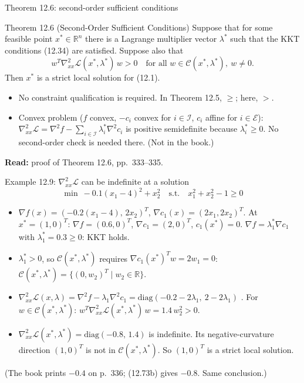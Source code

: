 \documentclass[aspectratio=169,12pt]{beamer}
\newcommand{\R}{\mathbb{R}}
\newcommand{\xs}{x^{*}}
\newcommand{\gradf}{\nabla f}
\newcommand{\hessf}{\nabla^{2} f}
\newcommand{\eqn}[1]{\text{\small(#1)}}
\newcommand{\readbook}[1]{{\color{red}\textbf{Read:} #1}}
\newcommand{\ls}{\lambda^{*}}
\newcommand{\cC}{\mathcal{C}}
\newcommand{\cE}{\mathcal{E}}
\newcommand{\cI}{\mathcal{I}}
\newcommand{\cL}{\mathcal{L}}
\newcommand{\hessL}{\nabla_{xx}^{2}\cL}
\begin{document}
\begin{frame}{Theorem 12.6: second-order sufficient conditions}
  \begin{block}{Theorem 12.6 (Second-Order Sufficient Conditions)}
    Suppose that for some feasible point $\xs\in\R^{n}$ there is a Lagrange multiplier vector $\ls$
    such that the KKT conditions (12.34) are satisfied. Suppose also that
    \[ w^{T}\hessL(\xs,\ls)\,w>0\quad\text{for all } w\in\cC(\xs,\ls),\ w\ne 0 . \tag{12.65} \]
    Then $\xs$ is a strict local solution for (12.1).
  \end{block}
  \begin{itemize}\setlength\itemsep{0.35em}
    \item No constraint qualification is required. In Theorem 12.5, $\ge$; here, $>$.
    \item Convex problem ($f$ convex, $-c_{i}$ convex for $i\in\cI$, $c_{i}$ affine for $i\in\cE$):
      $\hessL=\hessf-\sum_{i\in\cI}\ls_{i}\nabla^{2}c_{i}$ is positive semidefinite because $\ls_{i}\ge 0$.
      No second-order check is needed there. (Not in the book.)
  \end{itemize}
  \readbook{proof of Theorem 12.6, pp.~333--335.}
\end{frame}

\begin{frame}{Example 12.9: $\hessL$ can be indefinite at a solution}
  \[ \min\ -0.1(x_{1}-4)^{2}+x_{2}^{2}\quad\text{s.t.}\quad x_{1}^{2}+x_{2}^{2}-1\ge 0 \tag{12.72} \]
  \begin{itemize}\setlength\itemsep{0.3em}
    \item $\gradf(x)=(-0.2(x_{1}-4),\,2x_{2})^{T}$, $\nabla c_{1}(x)=(2x_{1},2x_{2})^{T}$.
      At $\xs=(1,0)^{T}$: $\gradf=(0.6,0)^{T}$, $\nabla c_{1}=(2,0)^{T}$, $c_{1}(\xs)=0$.
      $\gradf=\ls_{1}\nabla c_{1}$ with $\ls_{1}=0.3\ge 0$: KKT holds.
    \item $\ls_{1}>0$, so $\cC(\xs,\ls)$ requires $\nabla c_{1}(\xs)^{T}w=2w_{1}=0$:
      $\cC(\xs,\ls)=\{(0,w_{2})^{T}\mid w_{2}\in\R\}$.
    \item $\hessL(x,\lambda)=\hessf-\lambda_{1}\nabla^{2}c_{1}=\mathrm{diag}(-0.2-2\lambda_{1},\ 2-2\lambda_{1})$ \eqn{12.73b}.
      For $w\in\cC(\xs,\ls)$: $w^{T}\hessL(\xs,\ls)\,w=1.4\,w_{2}^{2}>0$.
    \item $\hessL(\xs,\ls)=\mathrm{diag}(-0.8,\,1.4)$ is indefinite. Its negative-curvature direction
      $(1,0)^{T}$ is not in $\cC(\xs,\ls)$. So $(1,0)^{T}$ is a strict local solution.
  \end{itemize}
  {\small (The book prints $-0.4$ on p.~336; (12.73b) gives $-0.8$. Same conclusion.)}
\end{frame}
\end{document}
